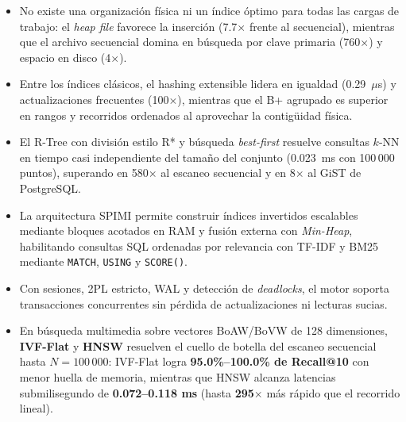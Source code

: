 \documentclass[11pt,a4paper]{article}
\begin{document}
\begin{itemize}
  \item No existe una organización física ni un índice óptimo para todas las cargas de trabajo: el \emph{heap file} favorece la inserción (7.7$\times$ frente al secuencial), mientras que el archivo secuencial domina en búsqueda por clave primaria (760$\times$) y espacio en disco (4$\times$).
  \item Entre los índices clásicos, el hashing extensible lidera en igualdad (0.29~$\mu$s) y actualizaciones frecuentes (100$\times$), mientras que el B+ agrupado es superior en rangos y recorridos ordenados al aprovechar la contigüidad física.
  \item El R-Tree con división estilo R* y búsqueda \emph{best-first} resuelve consultas $k$-NN en tiempo casi independiente del tamaño del conjunto (0.023~ms con 100\,000 puntos), superando en 580$\times$ al escaneo secuencial y en 8$\times$ al GiST de PostgreSQL.
  \item La arquitectura SPIMI permite construir índices invertidos escalables mediante bloques acotados en RAM y fusión externa con \emph{Min-Heap}, habilitando consultas SQL ordenadas por relevancia con TF-IDF y BM25 mediante \texttt{MATCH}, \texttt{USING} y \texttt{SCORE()}.
  \item Con sesiones, 2PL estricto, WAL y detección de \emph{deadlocks}, el motor soporta transacciones concurrentes sin pérdida de actualizaciones ni lecturas sucias.
  \item En búsqueda multimedia sobre vectores BoAW/BoVW de 128 dimensiones, \textbf{IVF-Flat} y \textbf{HNSW} resuelven el cuello de botella del escaneo secuencial hasta $N = 100\,000$: IVF-Flat logra \textbf{95.0\%--100.0\% de Recall@10} con menor huella de memoria, mientras que HNSW alcanza latencias submilisegundo de \textbf{0.072--0.118 ms} (hasta \textbf{295$\times$} más rápido que el recorrido lineal).
\end{itemize}
\end{document}
